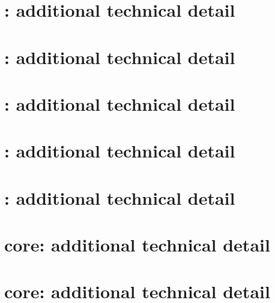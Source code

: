 \documentclass[preprint]{iacrtrans}
\begin{document}
\appendix

\clearpage
\section{:       additional technical detail}
\label{sec:pseudo:v1}

\clearpage
\section{:       additional technical detail}
\label{sec:pseudo:v2}

\clearpage
\section{:       additional technical detail}
\label{sec:pseudo:v3}

\clearpage
\section{:       additional technical detail}
\label{sec:pseudo:v4}

\clearpage
\section{:       additional technical detail}
\label{sec:pseudo:v5}


\clearpage
\section{\mbox{} core: additional technical detail}
\label{sec:core:2}

\clearpage
\section{\mbox{} core: additional technical detail}
\label{sec:core:1}


%

\end{document}
